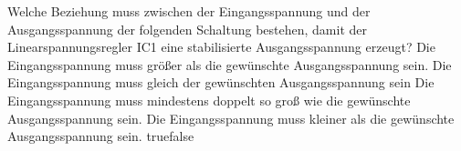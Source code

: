     {Welche Beziehung muss zwischen der Eingangsspannung und der Ausgangsspannung der folgenden Schaltung bestehen, damit der Linearspannungsregler IC1 eine stabilisierte Ausgangsspannung erzeugt?}
    {Die Eingangsspannung muss größer als die gewünschte Ausgangsspannung sein.}
    {Die Eingangsspannung muss gleich der gewünschten Ausgangsspannung sein}
    {Die Eingangsspannung muss mindestens doppelt so groß wie die gewünschte Ausgangsspannung sein.}
    {Die Eingangsspannung muss kleiner als die gewünschte Ausgangsspannung sein.}
    {true}{false}
